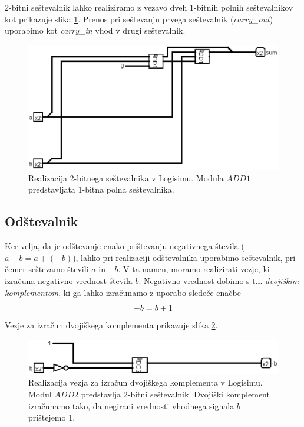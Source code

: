 2-bitni seštevalnik lahko realiziramo z vezavo dveh 1-bitnih polnih seštevalnikov kot prikazuje slika \ref{fig:add_2bit}. Prenos pri seštevanju prvega seštevalnik (\emph{carry\_out}) uporabimo kot \emph{carry\_in} vhod v drugi seštevalnik.

\begin{figure}[htbf]%
\begin{center}
\includegraphics[width=0.75\columnwidth]{procesor/img/add_2bit}%
\caption{Realizacija 2-bitnega seštevalnika v Logisimu. Modula $ADD1$ predstavljata 1-bitna polna seštevalnika.}%
\label{fig:add_2bit}%
\end{center}
\end{figure}

\subsection{Odštevalnik}
\label{sec:odstevalnik}
Ker velja, da je odštevanje enako prištevanju negativnega števila ($a-b=a+(-b)$), lahko pri realizaciji odštevalnika uporabimo seštevalnik, pri čemer seštevamo števili $a$ in $-b$. V ta namen, moramo realizirati vezje, ki izračuna negativno vrednost števila $b$. Negativno vrednost dobimo s t.i. \emph{dvojiškim komplementom}, ki ga lahko izračunamo z uporabo sledeče enačbe
$$
- b = \overline{b} + 1
$$
Vezje za izračun dvojiškega komplementa prikazuje slika \ref{fig:complement}.
\begin{figure}[htbf]%
\begin{center}
\includegraphics[width=0.75\columnwidth]{procesor/img/complement}%
\caption{Realizacija vezja za izračun dvojiškega komplementa v Logisimu. Modul $ADD2$ predstavlja 2-bitni seštevalnik. Dvojiški komplement izračunamo tako, da negirani vrednosti vhodnega signala $b$ prištejemo 1.}%
\label{fig:complement}%
\end{center}
\end{figure}

